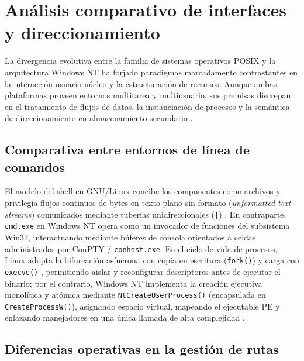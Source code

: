 \documentclass[12pt]{article}
\begin{document}
\section{Análisis comparativo de interfaces y direccionamiento}
\label{sec:analisisComparativoInterfaces}

La divergencia evolutiva entre la familia de sistemas operativos POSIX y la arquitectura Windows NT ha forjado paradigmas marcadamente contrastantes en la interacción usuario-núcleo y la estructuración de recursos. Aunque ambas plataformas proveen entornos multitarea y multiusuario, sus premisas discrepan en el tratamiento de flujos de datos, la instanciación de procesos y la semántica de direccionamiento en almacenamiento secundario \parencite[\S 2.3, p.\ 51]{silberschatz2006fundamentos}.

\subsection{Comparativa entre entornos de línea de comandos}
\label{subsec:comparativaEntornosLineasComandos}

El modelo del shell en GNU/Linux concibe los componentes como archivos y privilegia flujos continuos de bytes en texto plano sin formato (\textit{unformatted text streams}) comunicados mediante tuberías unidireccionales (\texttt{|}) \parencite[\S 1.4, p.\ 38]{stallings2018operating}. En contraparte, \texttt{cmd.exe} en Windows NT opera como un invocador de funciones del subsistema Win32, interactuando mediante búferes de consola orientados a celdas administrados por ConPTY / \texttt{conhost.exe}. En el ciclo de vida de procesos, Linux adopta la bifurcación asíncrona con copia en escritura (\texttt{fork()}) y carga con \texttt{execve()} \parencite[\S 3.2, p.\ 122]{carretero2001sistemas}, permitiendo aislar y reconfigurar descriptores antes de ejecutar el binario; por el contrario, Windows NT implementa la creación ejecutiva monolítica y atómica mediante \texttt{NtCreateUserProcess()} (encapsulada en \texttt{CreateProcessW()}), asignando espacio virtual, mapeando el ejecutable PE y enlazando manejadores en una única llamada de alta complejidad \parencite[\S 21.4, p.\ 1044]{deitel2004operating}.

\subsection{Diferencias operativas en la gestión de rutas}
\label{subsec:diferenciasGestionRutas}
\end{document}
